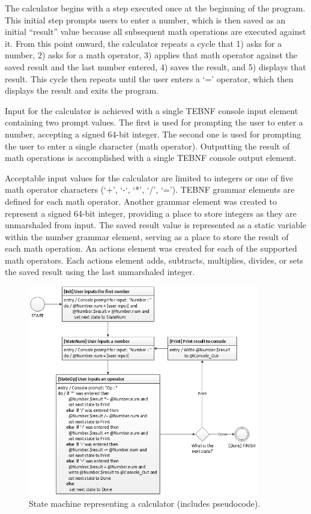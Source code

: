 \indent
The calculator begins with a step executed once at the beginning of the program. This initial step prompts users to enter a number, which is then saved as an initial “result” value because all subsequent math operations are executed against it.  From this point onward, the calculator repeats a cycle that 1) asks for a number, 2) asks for a math operator, 3) applies that math operator against the saved result and the last number entered, 4) saves the result, and 5) displays that result.   This cycle then repeats until the user enters a ‘=’ operator, which then displays the result and exits the program.

\indent
Input for the calculator is achieved with a single TEBNF console input element containing two prompt values.  The first is used for prompting the user to enter a number, accepting a signed 64-bit integer.  The second one is used for prompting the user to enter a single character (math operator).  Outputting the result of math operations is accomplished with a single TEBNF console output element.

\indent
Acceptable input values for the calculator are limited to integers or one of five math operator characters (‘+’, ‘-‘, ‘*’, ‘/’, ‘=’).  TEBNF grammar elements are defined for each math operator.  Another grammar element was created to represent a signed 64-bit integer, providing a place to store integers as they are unmarshaled from input.  The saved result value is represented as a static variable within the number grammar element, serving as a place to store the result of each math operation.  An actions element was created for each of the supported math operators.  Each actions element adds, subtracts, multiplies, divides, or sets the saved result using the last unmarshaled integer.

\begin{figure}[htbp]
\centering
\includegraphics[width=0.9\textwidth]{figures/CalculatorUmlStateMachine.png}
\caption[State machine representing a calculator.]{State machine representing a calculator (includes pseudocode).}
\label{fig:CalculatorUmlStateMachine}
\end{figure}

